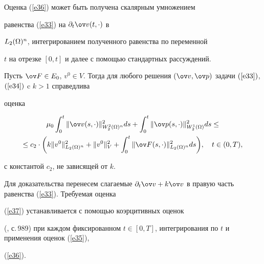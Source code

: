 Оценка (\ref{e36}) может быть получена скалярным умножением


равенства (\ref{e33}) на $\partial_t\ov v(t,\cdot)$ в


$L_2(\Omega)^n$, интегрированием полученного равенства по переменной


$t$ на отрезке $[0,t]$ и далее с помощью стандартных рассуждений.





\begin{lems}


\label{l33}


Пусть $\ov F\in E_0$, $v^0\in V$. Тогда для любого решения $(\ov


v, \ov p)$ задачи $(\ref{e33})$, $(\ref{e34})$ c $k>1$ справедлива


оценка


\begin{multline}\label{e37}


\mu_0 \intl {0}{t} \|\ov


v(s,\cdot)\|_{W_2^2(\Om)^n}^2 ds+\intl {0}{t} \|\ov


p(s,\cdot)\|_{W_2^1(\Om)}^2 ds \le \\


\le c_2 \cdot \bigg(k\|v^0\|_{L_2(\Om)^n}^2+\| v^0\|_V^2


+\intl {0}{t}\|\ov F(s,\cdot)\|_{L_2(\Om)^n}^2 ds \bigg),\quad t


\in (0,T),


\end{multline}


с константой $c_2$, не зависящей от $k$.


\end{lems}





Для доказательства перенесем слагаемые $\partial_t \ov v+k \ov


v$ в правую часть равенства (\ref{e33}). Требуемая оценка


(\ref{e37}) устанавливается с помощью коэрцитивных оценок 


(\cite{Sol}, с.\,989) при каждом фиксированном $t \in


[0,T]$, интегрирования по $t$ и применения оценок (\ref{e35}),


(\ref{e36}).





